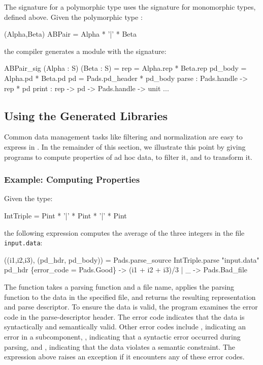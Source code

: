 \documentclass{sigplanconf}
\begin{document}
The signature for a polymorphic \padsml{} type uses the signature
 for monomorphic types, defined above.  
Given the polymorphic \padsml{} type :
\begin{code}\scriptsize
{} (Alpha,Beta) ABPair = Alpha * '|' * Beta\end{code}%
the compiler generates a module with the signature:
\begin{code}\scriptsize
{}  ABPair_sig (Alpha : S) (Beta : S) = 
   rep      = Alpha.rep * Beta.rep
   pd\_body = Alpha.pd * Beta.pd
   pd       = Pads.pd_header * pd\_body
    parse    : Pads.handle -> rep * pd
    print    : rep -> pd -> Pads.handle -> unit
  ...
\end{code}%

\subsection{Using the Generated Libraries}
Common data management tasks like filtering and normalization are easy to express in \ocaml{}.  In the remainder of this section, we illustrate this point by giving \ocaml{} programs to compute properties of ad hoc data, to filter it, and to transform it.


\subsubsection{Example: Computing Properties}
\label{sec:ex-process}
Given the \padsml{} type:
\begin{code}\scriptsize
{} IntTriple = Pint * '|' * Pint * '|' * Pint\end{code}%
the following \ocaml{} expression computes the average of the three integers in the file \texttt{input.data}:
\begin{code}\scriptsize
{} ((i1,i2,i3), (pd_hdr, pd_body)) = 
 Pads.parse_source IntTriple.parse "input.data" 
 pd_hdr 
  \{error_code = Pads.Good\} -> (i1 + i2 + i3)/3
{|} _ ->  Pads.Bad_file \end{code}%
\noindent
The  function takes a parsing function and a file
name, applies the parsing function to the data in the specified file,
and returns the resulting representation and parse descriptor.  To
ensure the data is valid, the program examines the error code in the parse-descriptor header.  The error code  indicates that the data
is syntactically and semantically valid. Other error codes include
, indicating an error in a subcomponent, , indicating
that a syntactic error occurred during parsing, and ,
indicating that the data violates a semantic constraint. The
expression above raises an exception if it encounters any of these
error codes.
\end{document}
